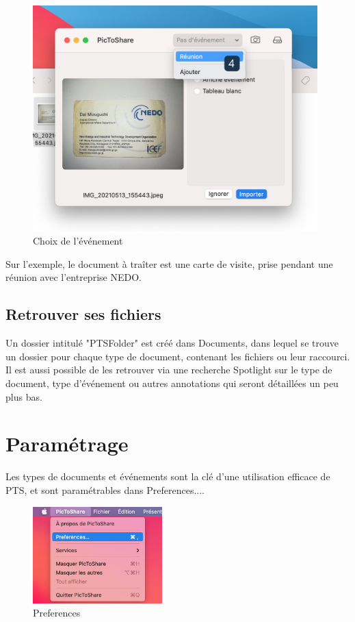 \documentclass[a4paper,11pt]{article}
\begin{document}
	\begin{figure}[h]
		\centering
		\includegraphics[width=11cm]{Importation_event}
		\caption{Choix de l'événement}
	\end{figure}
	
	
	Sur l'exemple, le document à traîter est une carte de visite, prise pendant une réunion avec l'entreprise NEDO.
	
	\subsection{Retrouver ses fichiers}
	Un dossier intitulé "PTSFolder" est créé dans Documents, dans lequel se trouve un dossier pour chaque type de document, contenant les fichiers ou leur raccourci. Il est aussi possible de les retrouver via une recherche Spotlight sur le type de document, type d'événement ou autres annotations qui seront détaillées un peu plus bas.
	
	
	
	\section{Paramétrage}
	Les types de documents et événements sont la clé d'une utilisation efficace de PTS, et sont paramétrables dans Preferences....
	\begin{figure}[h!]
		\centering
		\includegraphics[width=5cm]{Preferences}
		\caption{Preferences}
	\end{figure}
	
\end{document}
